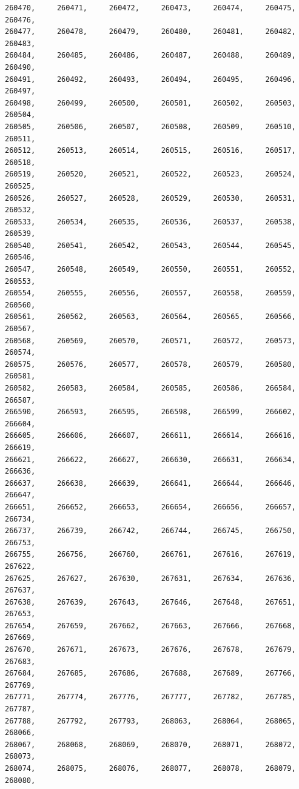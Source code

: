 \documentclass[a4paper,11pt]{report}
\begin{document}
\begin{verbatim}
260470,     260471,     260472,     260473,     260474,     260475,     260476,
260477,     260478,     260479,     260480,     260481,     260482,     260483,
260484,     260485,     260486,     260487,     260488,     260489,     260490,
260491,     260492,     260493,     260494,     260495,     260496,     260497,
260498,     260499,     260500,     260501,     260502,     260503,     260504,
260505,     260506,     260507,     260508,     260509,     260510,     260511,
260512,     260513,     260514,     260515,     260516,     260517,     260518,
260519,     260520,     260521,     260522,     260523,     260524,     260525,
260526,     260527,     260528,     260529,     260530,     260531,     260532,
260533,     260534,     260535,     260536,     260537,     260538,     260539,
260540,     260541,     260542,     260543,     260544,     260545,     260546,
260547,     260548,     260549,     260550,     260551,     260552,     260553,
260554,     260555,     260556,     260557,     260558,     260559,     260560,
260561,     260562,     260563,     260564,     260565,     260566,     260567,
260568,     260569,     260570,     260571,     260572,     260573,     260574,
260575,     260576,     260577,     260578,     260579,     260580,     260581,
260582,     260583,     260584,     260585,     260586,     266584,     266587,
266590,     266593,     266595,     266598,     266599,     266602,     266604,
266605,     266606,     266607,     266611,     266614,     266616,     266619,
266621,     266622,     266627,     266630,     266631,     266634,     266636,
266637,     266638,     266639,     266641,     266644,     266646,     266647,
266651,     266652,     266653,     266654,     266656,     266657,     266734,
266737,     266739,     266742,     266744,     266745,     266750,     266753,
266755,     266756,     266760,     266761,     267616,     267619,     267622,
267625,     267627,     267630,     267631,     267634,     267636,     267637,
267638,     267639,     267643,     267646,     267648,     267651,     267653,
267654,     267659,     267662,     267663,     267666,     267668,     267669,
267670,     267671,     267673,     267676,     267678,     267679,     267683,
267684,     267685,     267686,     267688,     267689,     267766,     267769,
267771,     267774,     267776,     267777,     267782,     267785,     267787,
267788,     267792,     267793,     268063,     268064,     268065,     268066,
268067,     268068,     268069,     268070,     268071,     268072,     268073,
268074,     268075,     268076,     268077,     268078,     268079,     268080,

\end{verbatim}
\end{document}
